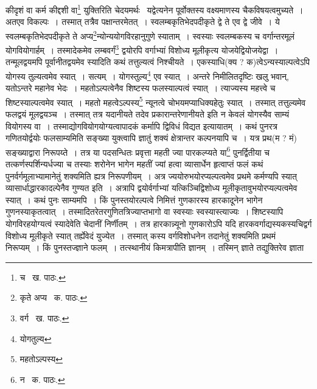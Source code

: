 \documentclass[11pt, openany]{book}
\begin{document}
\noindent कीदृशं वा कर्म कीद्दशी वा\renewcommand{\thefootnote}{१}\footnote{च \textendash\ ख. पाठः.} युक्तिरिति चेदयमर्थः \textendash\ यद्वेत्यनेन पूर्वोक्तस्य वक्ष्यमाणस्य चैकविषयत्वमुच्यते~। अतएव विकल्पः~। तस्मात् तत्रैव पक्षान्तरमेतत्~। स्वलम्बकृतिभेदपदीकृते द्वे ते एव द्वे जीवे~। ये स्वलम्बकृतिभेदपदीकृते ते अप्य\renewcommand{\thefootnote}{२}\footnote{कृते अप्य \textendash\ क. पाठः.}न्योन्ययोगविरहानुगुणे स्याताम्~। स्वस्याः स्वलम्बकस्य च वर्गान्तरमूलं योगवियोगार्हम्~। तस्मादेकमेव लम्बवर्गं\renewcommand{\thefootnote}{३}\footnote{वर्ग \textendash\ ख. पाठः.} द्वयोरपि वर्गाभ्यां विशोध्य मूलीकृत्य योजयेद्वियोजयेद्वा~। तन्मूलद्वयमपि पूर्वानीतद्वयमेव स्यादिति कथं तत्तुल्यत्वं निश्चीयते~। एकस्याधि(क्य ? क)त्वेऽन्यस्याल्पत्वेऽपि योगस्य तुल्यत्वमेव स्यात्~। सत्यम्~। योगस्तुल्य\renewcommand{\thefootnote}{४}\footnote{योगतुल्य} एव स्यात्~। अन्तरे निमीलितदृष्टिः खलु भवान्, यतोऽन्तरे महानेव भेदः~। महतोऽल्पत्वेनैव शिष्टस्य फलस्याल्पत्वं स्यात्~। त्याज्यस्य महत्त्वे च शिष्टस्याल्पत्वमेव स्यात्~। महतो महत्वेऽल्पस्य\renewcommand{\thefootnote}{५}\footnote{महतोऽल्पस्य} न्यूनत्वे चोभयमप्याधिक्यहेतुः स्यात्~। तस्मात् तत्तुल्यमेव फलद्वयं मूलद्वयञ्च~। तस्मात् तत्र यदानीयते तदेव प्रकारान्तरेणानीयते इति न केवलं योगस्यैव साम्यं वियोगस्य वा~। तस्माद्योगवियोगयोग्यत्वापादकं कर्मापि द्विविधं विद्यत इत्यायातम्~। कथं पुनरत्र गणितयोर्द्वयोः फलसाम्यमिति सङ्ख्या युक्त्वापि ज्ञातुं शक्यं क्षेत्रान्तर कल्पनयापि च~। यत्र प्रथ(म ? मं) सङ्ख्याद्वारा निरूपय्ते~। तत्र या पदसन्धितः प्रवृत्ता महती ज्या पारकल्प्यते या\renewcommand{\thefootnote}{६}\footnote{न \textendash\ क. पाठः.} पुनर्द्वितीया च तत्कर्णस्पर्शिन्यर्धज्या च तस्याः शरोनेन भागेन महतीं ज्यां हत्वा व्यासार्धेन हृत्वाप्तं फलं कथं पुनर्वर्गमूलाभ्यामानेतुं शक्यमिति ह्यत्र निरूपणीयम्~। अत्र ज्ययोरुभयोरप्यल्पत्वमेव प्रथमे कर्मण्यपि स्यात् व्यासार्धाद्धारकादल्पेनैव
गुण्यत इति~। अत्रापि द्वयोर्वर्गाभ्यां यत्किञ्चिद्विशोध्य मूलीकृतावुभयोरप्यल्पत्वमेव स्यात्~। कथं पुनः साम्यमपि~। किं पुनस्तयोरल्पत्वे निमित्तं गुणकारस्य हारकादूनेन भागेन गुणनस्याकृतत्वात्~। तस्मादितरेतरगुणितत्रिज्याप्तभागो वा स्वस्याः स्वस्यास्त्याज्यः~। शिष्टस्यापि योगविरहयोग्यत्वं
स्यादेवेति चेदानीं निर्णीतम्~। तत्र हारकान्न्यूनो गुणकारोऽपि यदि हारकवर्गाद्यस्यकस्यचिद्वर्ग विशोध्य मूलीकृते स्यात् तर्ह्येवेदं युज्येत~। तस्मात्
कस्य वर्गविशोधनेन तदानेतुं शक्यमिति प्रथमं निरूप्यम्~। किं पुनस्तज्ज्ञाने फलम्~। तत्स्थानीयं किमत्रापीति ज्ञानम्~। तस्मिन् ज्ञाते तद्युक्तिरेव
ज्ञाता

\newpage 
\end{document}
